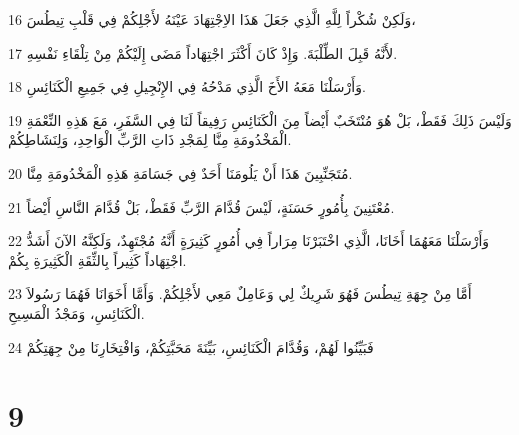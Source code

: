 \par 16 وَلَكِنْ شُكْراً لِلَّهِ الَّذِي جَعَلَ هَذَا الاِجْتِهَادَ عَيْنَهُ لأَجْلِكُمْ فِي قَلْبِ تِيطُسَ،
\par 17 لأَنَّهُ قَبِلَ الطِّلْبَةَ. وَإِذْ كَانَ أَكْثَرَ اجْتِهَاداً مَضَى إِلَيْكُمْ مِنْ تِلْقَاءِ نَفْسِهِ.
\par 18 وَأَرْسَلْنَا مَعَهُ الأَخَ الَّذِي مَدْحُهُ فِي الإِنْجِيلِ فِي جَمِيعِ الْكَنَائِسِ.
\par 19 وَلَيْسَ ذَلِكَ فَقَطْ، بَلْ هُوَ مُنْتَخَبٌ أَيْضاً مِنَ الْكَنَائِسِ رَفِيقاً لَنَا فِي السَّفَرِ، مَعَ هَذِهِ النِّعْمَةِ الْمَخْدُومَةِ مِنَّا لِمَجْدِ ذَاتِ الرَّبِّ الْوَاحِدِ، وَلِنَشَاطِكُمْ.
\par 20 مُتَجَنِّبِينَ هَذَا أَنْ يَلُومَنَا أَحَدٌ فِي جَسَامَةِ هَذِهِ الْمَخْدُومَةِ مِنَّا.
\par 21 مُعْتَنِينَ بِأُمُورٍ حَسَنَةٍ، لَيْسَ قُدَّامَ الرَّبِّ فَقَطْ، بَلْ قُدَّامَ النَّاسِ أَيْضاً.
\par 22 وَأَرْسَلْنَا مَعَهُمَا أَخَانَا، الَّذِي اخْتَبَرْنَا مِرَاراً فِي أُمُورٍ كَثِيرَةٍ أَنَّهُ مُجْتَهِدٌ، وَلَكِنَّهُ الآنَ أَشَدُّ اجْتِهَاداً كَثِيراً بِالثِّقَةِ الْكَثِيرَةِ بِكُمْ.
\par 23 أَمَّا مِنْ جِهَةِ تِيطُسَ فَهُوَ شَرِيكٌ لِي وَعَامِلٌ مَعِي لأَجْلِكُمْ. وَأَمَّا أَخَوَانَا فَهُمَا رَسُولاَ الْكَنَائِسِ، وَمَجْدُ الْمَسِيحِ.
\par 24 فَبَيِّنُوا لَهُمْ، وَقُدَّامَ الْكَنَائِسِ، بَيِّنَةَ مَحَبَّتِكُمْ، وَافْتِخَارِنَا مِنْ جِهَتِكُمْ

\chapter{9}

